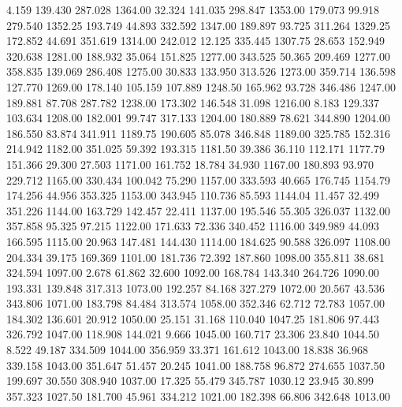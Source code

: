    4.159  139.430  287.028      1364.00
  32.324  141.035  298.847      1353.00
 179.073   99.918  279.540      1352.25
 193.749   44.893  332.592      1347.00
 189.897   93.725  311.264      1329.25
 172.852   44.691  351.619      1314.00
 242.012   12.125  335.445      1307.75
  28.653  152.949  320.638      1281.00
 188.932   35.064  151.825      1277.00
 343.525   50.365  209.469      1277.00
 358.835  139.069  286.408      1275.00
  30.833  133.950  313.526      1273.00
 359.714  136.598  127.770      1269.00
 178.140  105.159  107.889      1248.50
 165.962   93.728  346.486      1247.00
 189.881   87.708  287.782      1238.00
 173.302  146.548   31.098      1216.00
   8.183  129.337  103.634      1208.00
 182.001   99.747  317.133      1204.00
 180.889   78.621  344.890      1204.00
 186.550   83.874  341.911      1189.75
 190.605   85.078  346.848      1189.00
 325.785  152.316  214.942      1182.00
 351.025   59.392  193.315      1181.50
  39.386   36.110  112.171      1177.79
 151.366   29.300   27.503      1171.00
 161.752   18.784   34.930      1167.00
 180.893   93.970  229.712      1165.00
 330.434  100.042   75.290      1157.00
 333.593   40.665  176.745      1154.79
 174.256   44.956  353.325      1153.00
 343.945  110.736   85.593      1144.04
  11.457   32.499  351.226      1144.00
 163.729  142.457   22.411      1137.00
 195.546   55.305  326.037      1132.00
 357.858   95.325   97.215      1122.00
 171.633   72.336  340.452      1116.00
 349.989   44.093  166.595      1115.00
  20.963  147.481  144.430      1114.00
 184.625   90.588  326.097      1108.00
 204.334   39.175  169.369      1101.00
 181.736   72.392  187.860      1098.00
 355.811   38.681  324.594      1097.00
   2.678   61.862   32.600      1092.00
 168.784  143.340  264.726      1090.00
 193.331  139.848  317.313      1073.00
 192.257   84.168  327.279      1072.00
  20.567   43.536  343.806      1071.00
 183.798   84.484  313.574      1058.00
 352.346   62.712   72.783      1057.00
 184.302  136.601   20.912      1050.00
  25.151   31.168  110.040      1047.25
 181.806   97.443  326.792      1047.00
 118.908  144.021    9.666      1045.00
 160.717   23.306   23.840      1044.50
   8.522   49.187  334.509      1044.00
 356.959   33.371  161.612      1043.00
  18.838   36.968  339.158      1043.00
 351.647   51.457   20.245      1041.00
 188.758   96.872  274.655      1037.50
 199.697   30.550  308.940      1037.00
  17.325   55.479  345.787      1030.12
  23.945   30.899  357.323      1027.50
 181.700   45.961  334.212      1021.00
 182.398   66.806  342.648      1013.00
